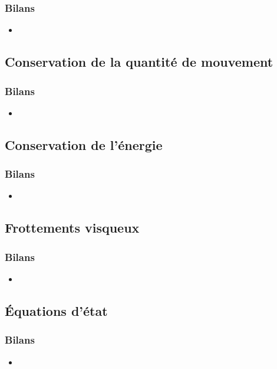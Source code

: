 \documentclass[%
	final, %
	 10pt, %
 	compress, %
hyperref={bookmarks=true}	
]{beamer}
\begin{document}
\begin{frame}\frametitle{Bilans}
\begin{itemize}
\item 
\end{itemize}
\end{frame}


\subsection{Conservation de la quantité de mouvement}
\label{sec:conservation-de-la-1}

\begin{frame}\frametitle{Bilans}
\begin{itemize}
\item 
\end{itemize}
\end{frame}

\subsection{Conservation de l'énergie}
\label{sec:cons-de-lenerg}

\begin{frame}\frametitle{Bilans}
\begin{itemize}
\item 
\end{itemize}
\end{frame}

\subsection{Frottements visqueux}
\label{sec:frottements-visqueux}

\begin{frame}\frametitle{Bilans}
\begin{itemize}
\item 
\end{itemize}
\end{frame}

\subsection{Équations d'état}
\label{sec:equations-detat}

\begin{frame}\frametitle{Bilans}
\begin{itemize}
\item 
\end{itemize}
\end{frame}
\end{document}
